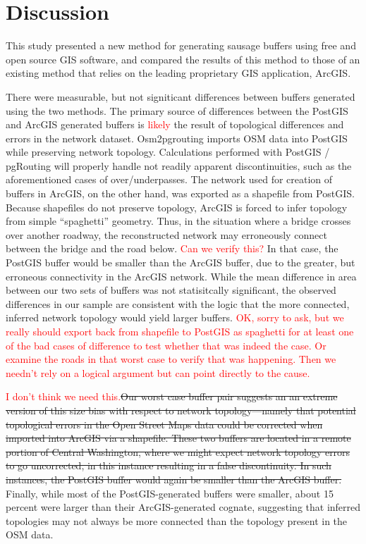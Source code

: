 \documentclass[11pt,letterpaper]{article} %
\begin{document}
\section*{Discussion}
This study presented a new method for generating sausage buffers using free and open source GIS software, and compared the results of this method to those of an existing method that relies on the leading proprietary GIS application, ArcGIS. 

There were measurable, but not signiticant differences between buffers generated using the two methods. The primary source of differences between the PostGIS
and ArcGIS generated buffers is \textcolor{red}{likely} the result of topological differences
and errors in the network dataset. Osm2pgrouting imports OSM data into PostGIS while preserving network topology. Calculations performed with
PostGIS / pgRouting will properly handle not readily apparent discontinuities,
such as the aforementioned cases of over/underpasses. The network used for creation of buffers in ArcGIS, on the other hand,
was exported as a shapefile from PostGIS. Because shapefiles do not preserve topology,
ArcGIS is forced to infer topology from simple ``spaghetti'' geometry. Thus, in the 
situation where a bridge crosses over another roadway, the
reconstructed network may erroneously connect between the bridge and
the road below. \textcolor{red}{Can we verify this?} In that case, the PostGIS
buffer would be smaller than the ArcGIS buffer, due to the greater, but erroneous 
connectivity in the ArcGIS network. While the mean difference in area
between our two sets of buffers was not statisitcally significant, the observed differences in our sample are consistent with the
logic that the more connected, inferred network topology would yield
larger buffers. \textcolor{red}{OK, sorry to ask, but we really should export back from shapefile to PostGIS as spaghetti for at least one of the bad cases of difference to test whether that was indeed the case. Or examine the roads in that worst case to verify that was happening. Then we needn't rely on a logical argument but can point directly to the cause.}

\textcolor{red}{I don't think we need this.}\st{Our worst case buffer pair suggests an an extreme version of this size
bias with respect to network topology---namely that potential
topological errors in the Open Street Maps data could be corrected
when imported into ArcGIS via a shapefile. These two buffers are
located in a remote portion of Central Washington, where we might
expect network topology errors to go uncorrected, in this instance
resulting in a false discontinuity. In such instances, the PostGIS
buffer would again be smaller than the ArcGIS buffer.} Finally, while
most of the PostGIS-generated buffers were smaller, about 15 percent
were larger than their ArcGIS-generated cognate, suggesting that
inferred topologies may not always be more connected than the topology
present in the OSM data.
\end{document}

